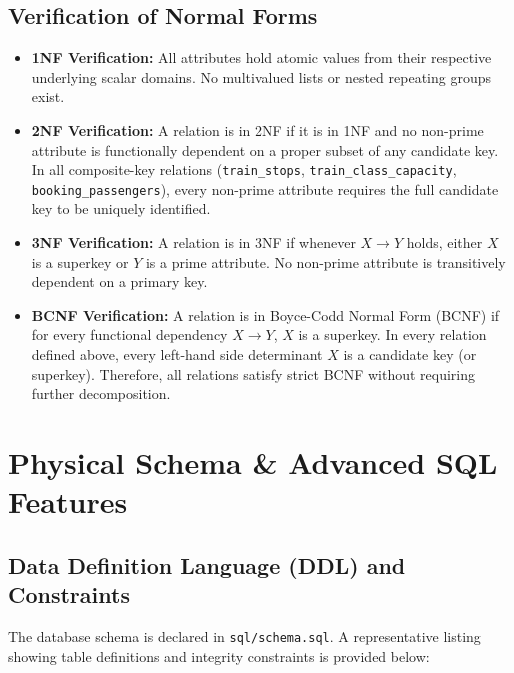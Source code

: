 \documentclass[12pt,a4paper]{report}
\begin{document}
\section{Verification of Normal Forms}
\begin{itemize}
    \item \textbf{1NF Verification:} All attributes hold atomic values from their respective underlying scalar domains. No multivalued lists or nested repeating groups exist.
    \item \textbf{2NF Verification:} A relation is in 2NF if it is in 1NF and no non-prime attribute is functionally dependent on a proper subset of any candidate key. In all composite-key relations (\texttt{train\_stops}, \texttt{train\_class\_capacity}, \texttt{booking\_passengers}), every non-prime attribute requires the full candidate key to be uniquely identified.
    \item \textbf{3NF Verification:} A relation is in 3NF if whenever $X \to Y$ holds, either $X$ is a superkey or $Y$ is a prime attribute. No non-prime attribute is transitively dependent on a primary key.
    \item \textbf{BCNF Verification:} A relation is in Boyce-Codd Normal Form (BCNF) if for every functional dependency $X \to Y$, $X$ is a superkey. In every relation defined above, every left-hand side determinant $X$ is a candidate key (or superkey). Therefore, all relations satisfy strict BCNF without requiring further decomposition.
\end{itemize}

\chapter{Physical Schema \& Advanced SQL Features}

\section{Data Definition Language (DDL) and Constraints}
The database schema is declared in \texttt{sql/schema.sql}. A representative listing showing table definitions and integrity constraints is provided below:
\end{document}
